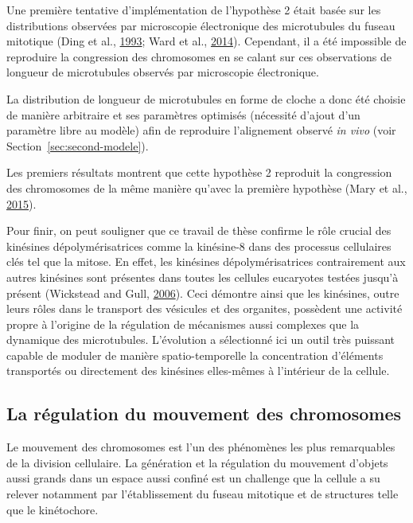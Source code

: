 \documentclass[12pt,a4paper,twoside,openright]{book}
\begin{document}
Une première tentative d'implémentation de l'hypothèse 2 était basée sur
les distributions observées par microscopie électronique des
microtubules du fuseau mitotique (Ding et al.,
\protect\hyperlink{ref-Ding1993a}{1993}; Ward et al.,
\protect\hyperlink{ref-Ward2014}{2014}). Cependant, il a été impossible
de reproduire la congression des chromosomes en se calant sur ces
observations de longueur de microtubules observés par microscopie
électronique.

La distribution de longueur de microtubules en forme de cloche a donc
été choisie de manière arbitraire et ses paramètres optimisés (nécessité
d'ajout d'un paramètre libre au modèle) afin de reproduire l'alignement
observé \emph{in vivo} (voir Section~\ref{sec:second-modele}).

Les premiers résultats montrent que cette hypothèse 2 reproduit la
congression des chromosomes de la même manière qu'avec la première
hypothèse (Mary et al., \protect\hyperlink{ref-Mary2015}{2015}).

Pour finir, on peut souligner que ce travail de thèse confirme le rôle
crucial des kinésines dépolymérisatrices comme la kinésine-8 dans des
processus cellulaires clés tel que la mitose. En effet, les kinésines
dépolymérisatrices contrairement aux autres kinésines sont présentes
dans toutes les cellules eucaryotes testées jusqu'à présent (Wickstead
and Gull, \protect\hyperlink{ref-Wickstead2006}{2006}). Ceci démontre
ainsi que les kinésines, outre leurs rôles dans le transport des
vésicules et des organites, possèdent une activité propre à l'origine de
la régulation de mécanismes aussi complexes que la dynamique des
microtubules. L'évolution a sélectionné ici un outil très puissant
capable de moduler de manière spatio-temporelle la concentration
d'éléments transportés ou directement des kinésines elles-mêmes à
l'intérieur de la cellule.

\subsection{La régulation du mouvement des
chromosomes}\label{la-ruxe9gulation-du-mouvement-des-chromosomes}

Le mouvement des chromosomes est l'un des phénomènes les plus
remarquables de la division cellulaire. La génération et la régulation
du mouvement d'objets aussi grands dans un espace aussi confiné est un
challenge que la cellule a su relever notamment par l'établissement du
fuseau mitotique et de structures telle que le kinétochore.
\end{document}
